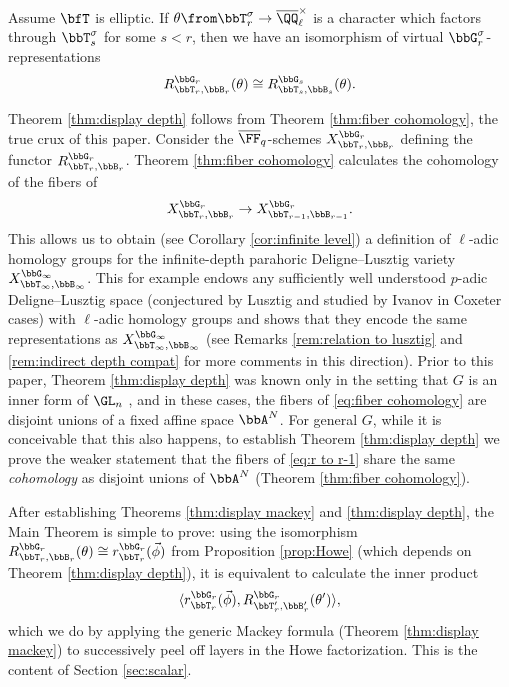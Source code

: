 \begin{displaytheorem}\label{thm:display depth}
  Assume $\bfT$ is elliptic. If $\theta \from \bbT_r^\sigma \to \overline \QQ_\ell^\times$ is a character which factors through $\bbT_s^\sigma$ for some $s < r$, then we have an isomorphism of virtual $\bbG_r^\sigma$-representations
  \begin{equation*}
    R_{\bbT_r,\bbB_r}^{\bbG_r}(\theta) \cong R_{\bbT_s,\bbB_s}^{\bbG_s}(\theta).
  \end{equation*}
\end{displaytheorem}

Theorem \ref{thm:display depth} follows from Theorem \ref{thm:fiber cohomology}, the true crux of this paper. Consider the $\overline \FF_q$-schemes $X_{\bbT_r,\bbB_r}^{\bbG_r}$ defining the functor $R_{\bbT_r,\bbB_r}^{\bbG_r}$. Theorem \ref{thm:fiber cohomology} calculates the cohomology of the fibers of
\begin{equation}\label{eq:r to r-1}
  X_{\bbT_r,\bbB_r}^{\bbG_r} \to X_{\bbT_{r-1},\bbB_{r-1}}^{\bbG_r}.
\end{equation}
This allows us to obtain (see  Corollary \ref{cor:infinite level}) a definition of $\ell$-adic homology groups for the infinite-depth parahoric Deligne--Lusztig variety $X_{\bbT_\infty,\bbB_\infty}^{\bbG_\infty}$. This for example endows any sufficiently well understood  $p$-adic Deligne--Lusztig space (conjectured by Lusztig \cite{Lus79} and studied by Ivanov \cite{I23arc,I23orbit} in Coxeter cases) with $\ell$-adic homology groups and shows that they encode the same representations as $X_{\bbT_\infty,\bbB_\infty}^{\bbG_\infty}$ (see Remarks \ref{rem:relation to lusztig} and \ref{rem:indirect depth compat} for more comments in this direction). Prior to this paper, Theorem \ref{thm:display depth} was known only in the setting that $G$ is an inner form of $\GL_n$ \cite{Lus79,Boy12,CI21-MA}, and in these cases, the fibers of \eqref{eq:fiber cohomology} are disjoint unions of a fixed affine space $\bbA^N$. For general $G$, while it is conceivable that this also happens, to establish Theorem \ref{thm:display depth} we prove the weaker statement that the fibers of \eqref{eq:r to r-1} share the same \textit{cohomology} as disjoint unions of $\bbA^N$ (Theorem \ref{thm:fiber cohomology}).  

After establishing Theorems \ref{thm:display mackey} and \ref{thm:display depth}, the Main Theorem is simple to prove: using the isomorphism $R_{\bbT_r,\bbB_r}^{\bbG_r}(\theta) \cong r_{\bbT_r}^{\bbG_r}(\vec \phi)$ from Proposition \ref{prop:Howe} (which depends on Theorem \ref{thm:display depth}), it is equivalent to calculate the inner product
\begin{equation*}
  \langle r_{\bbT_r}^{\bbG_r}(\vec \phi), R_{\bbT_r',\bbB_r'}^{\bbG_r}(\theta') \rangle,
\end{equation*}
which we do by applying the generic Mackey formula (Theorem \ref{thm:display mackey}) to successively peel off layers in the Howe factorization. This is the content of Section \ref{sec:scalar}.


